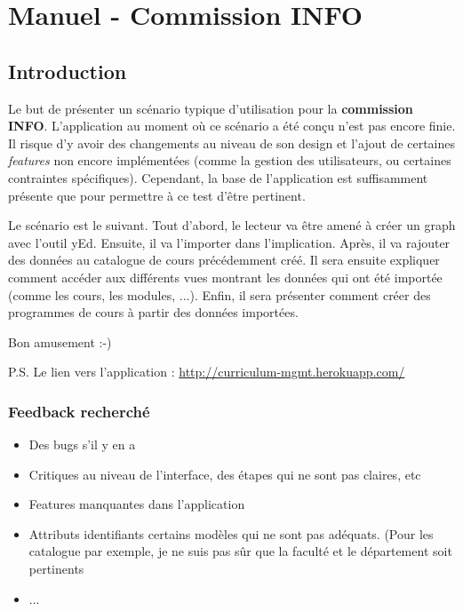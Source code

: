 
\chapter{Manuel - Commission INFO} %

\label{AppendixA} %


\section{Introduction}
Le but de présenter un scénario typique d'utilisation pour la \textbf{commission INFO}. L'application au moment où ce scénario a été conçu n'est pas encore finie. Il risque d'y avoir des changements au niveau de son design et l'ajout de certaines \textit{features} non encore implémentées (comme la gestion des utilisateurs, ou certaines contraintes spécifiques). Cependant, la base de l'application est suffisamment présente que pour permettre à ce test d’être pertinent.

Le scénario est le suivant. Tout d'abord, le lecteur va être amené à créer un graph avec l'outil yEd. Ensuite, il va l'importer dans l'implication. Après, il va rajouter des données au catalogue de cours précédemment créé. Il sera ensuite expliquer comment accéder aux différents vues montrant les données qui ont été importée (comme les cours, les modules, ...). Enfin, il sera présenter comment créer des programmes de cours à partir des données importées.



Bon amusement :-)

P.S. Le lien vers l'application : \url{http://curriculum-mgmt.herokuapp.com/}
\subsection{Feedback recherché}
\begin{itemize}
\item Des bugs s'il y en a
\item Critiques au niveau de l'interface, des étapes qui ne sont pas claires, etc
\item Features manquantes dans l'application
\item Attributs identifiants certains modèles qui ne sont pas adéquats. (Pour les catalogue par exemple, je ne suis pas sûr que la faculté et le département soit pertinents
\item ...
\end{itemize}
